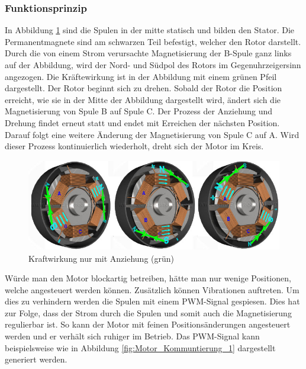 \subsubsection{Funktionsprinzip}

In Abbildung \ref{fig:Kraftwirkung_BLDC_1} sind die Spulen in der mitte statisch und bilden den Stator. Die Permanentmagnete sind am schwarzen Teil befestigt, welcher den Rotor darstellt. Durch die von einem Strom verursachte Magnetisierung der B-Spule ganz links auf der Abbildung, wird der Nord- und Südpol des Rotors im Gegenuhrzeigersinn angezogen. Die Kräftewirkung ist in der Abbildung mit einem grünen Pfeil dargestellt. Der Rotor beginnt sich zu drehen. Sobald der Rotor die Position erreicht, wie sie in der Mitte der Abbildung dargestellt wird, ändert sich die Magnetisierung von Spule B auf Spule C. Der Prozess der Anziehung und Drehung findet erneut statt und endet mit Erreichen der nächsten Position. Darauf folgt eine weitere Änderung der Magnetisierung von Spule C auf A. Wird dieser Prozess kontinuierlich wiederholt, dreht sich der Motor im Kreis.

\begin{figure}[h!]
	\centering
	\includegraphics[height=4cm]{graphics/BLDC_Kraftwirkung_1.jpg}
	\caption{Kraftwirkung nur mit Anziehung (grün) \cite{imajey_consulting_engineers_pvt_ltd_brushless_nodate}}
	\label{fig:Kraftwirkung_BLDC_1}
\end{figure}

Würde man den Motor blockartig betreiben, hätte man nur wenige Positionen, welche angesteuert werden können. Zusätzlich können Vibrationen auftreten. Um dies zu verhindern werden die Spulen mit einem PWM-Signal gespiesen. Dies hat zur Folge, dass der Strom durch die Spulen und somit auch die Magnetisierung regulierbar ist. So kann der Motor mit feinen Positionsänderungen angesteuert werden und er verhält sich ruhiger im Betrieb. Das PWM-Signal kann beispielsweise wie in Abbildung \ref{fig:Motor_Kommuntierung_1} dargestellt generiert werden.

